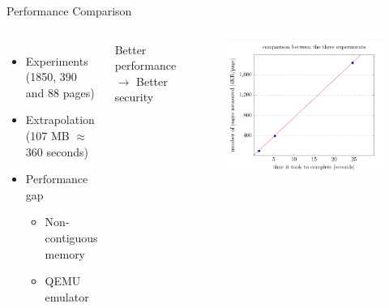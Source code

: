 \documentclass[]{beamer}
\begin{document}
\begin{frame}{Performance Comparison}
\begin{columns}
\begin{itemize}
\item Experiments (1850, 390 and 88 pages)
\item Extrapolation (107 MB $\approx$ 360 seconds)
\item Performance gap \begin{itemize}
\item Non-contiguous memory
\item QEMU emulator
\end{itemize}
\end{itemize}
\bigskip
Better performance \\
$\rightarrow$ Better security
\begin{figure}
\includegraphics[width=1\textwidth]{Pictures/experiments.png}
\end{figure}
\end{columns}
\end{frame}
\end{document}
